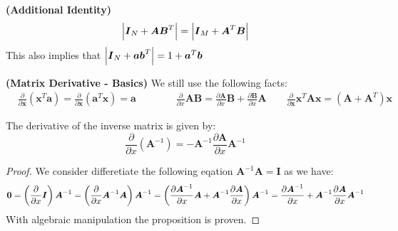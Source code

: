 \begin{remark}{\textbf{(Additional Identity)}}
    \begin{equation*} 
        \left| \boldsymbol I_N + \boldsymbol A\boldsymbol B^T \right| = \left| \boldsymbol I_M + \boldsymbol A^T\boldsymbol B \right| 
    \end{equation*} 
    This also implies that $\left| \boldsymbol I_N + \boldsymbol a\boldsymbol b^T \right| = 1 + \boldsymbol a^T\boldsymbol b$
\end{remark}

\begin{remark}{\textbf{(Matrix Derivative - Basics)}}
    We still use the following facts:
    \begin{equation*}
    \begin{aligned}
        &\frac{\partial}{\partial \boldsymbol x}(\boldsymbol x^T\boldsymbol a) = \frac{\partial}{\partial \boldsymbol x}(\boldsymbol a^T\boldsymbol x) = \boldsymbol a \qquad
        \qquad \frac{\partial}{\partial x} \boldsymbol A\boldsymbol B = \frac{\partial\boldsymbol A}{\partial x}\boldsymbol B + \frac{\partial\boldsymbol B}{\partial x}\boldsymbol A \qquad \frac{\partial}{\partial \boldsymbol x} \boldsymbol x^T\boldsymbol A\boldsymbol x = (\boldsymbol A+\boldsymbol A^T)\boldsymbol x
    \end{aligned}
    \end{equation*}
\end{remark}

\begin{proposition}
    The derivative of the inverse matrix is given by:
    \begin{equation*}
        \frac{\partial}{\partial x} (\boldsymbol A^{-1}) = -\boldsymbol A^{-1}\frac{\partial\boldsymbol A}{\partial x}\boldsymbol A^{-1}
    \end{equation*}
\end{proposition}
\begin{proof}
    We consider differetiate the following eqation $\boldsymbol A^{-1}\boldsymbol A = \boldsymbol I$ as we have:
    \begin{equation*}
    \begin{aligned}
        \boldsymbol 0 = \left( \frac{\partial}{\partial x}\boldsymbol I \right)\boldsymbol A^{-1} = \left( \frac{\partial }{\partial x}\boldsymbol A^{-1}\boldsymbol A \right)\boldsymbol A^{-1} &= \left( \frac{\partial \boldsymbol A^{-1}}{\partial x}\boldsymbol A +\boldsymbol A^{-1} \frac{\partial \boldsymbol A}{\partial x} \right)\boldsymbol A^{-1} = \frac{\partial \boldsymbol A^{-1}}{\partial x} +\boldsymbol A^{-1} \frac{\partial \boldsymbol A}{\partial x}\boldsymbol A^{-1} \\
    \end{aligned}
    \end{equation*}
    With algebraic manipulation the proposition is proven.
\end{proof}

